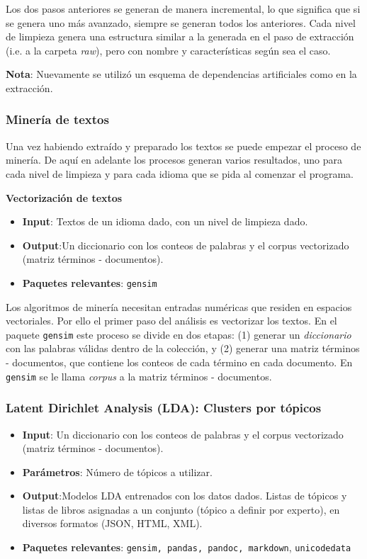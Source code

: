 Los dos pasos anteriores se generan de manera incremental, lo que significa que si se genera uno más avanzado, siempre se generan todos los anteriores. Cada nivel de limpieza genera una estructura similar a la generada en el paso de extracción (i.e. a la carpeta \emph{raw}), pero con nombre y características según sea el caso.

\textbf{Nota}: Nuevamente se utilizó un esquema de dependencias artificiales como en la extracción.

\subsubsection{ Minería de textos}

Una vez habiendo extraído y preparado los textos se puede empezar el proceso de minería. De aquí en adelante los procesos generan varios resultados, uno para cada nivel de limpieza y para cada idioma que se pida al comenzar el programa.

 \textbf{Vectorización de textos}


\begin{itemize}
\item \textbf{Input}: Textos de un idioma dado, con un nivel de limpieza dado.

\item \textbf{Output}:Un diccionario con los conteos de palabras y el corpus vectorizado (matriz términos - documentos).
\item \textbf{Paquetes relevantes}: \texttt{gensim}
\end{itemize}

Los algoritmos de minería necesitan entradas numéricas  que residen en espacios vectoriales. Por ello el primer paso del análisis es vectorizar los textos. En el paquete  \texttt{gensim} este proceso se divide en dos etapas: (1) generar un \emph{diccionario} con las palabras válidas dentro de la colección, y (2) generar una matriz términos - documentos, que contiene los conteos de cada término en cada documento. En  \texttt{gensim} se le llama \emph{corpus} a la matriz términos - documentos.

\subsubsection{ Latent Dirichlet Analysis (LDA): Clusters por tópicos}

\begin{itemize}

\item \textbf{Input}: Un diccionario con los conteos de palabras y el corpus vectorizado (matriz términos - documentos).
\item \textbf{Parámetros}: Número de tópicos a utilizar.
\item \textbf{Output}:Modelos LDA entrenados con los datos dados. Listas de tópicos y listas de libros asignadas a un conjunto (tópico a definir por experto), en diversos formatos (JSON, HTML, XML).
\item \textbf{Paquetes relevantes}: \texttt{gensim, pandas, pandoc, markdown}, \texttt{unicodedata}
\end{itemize}


